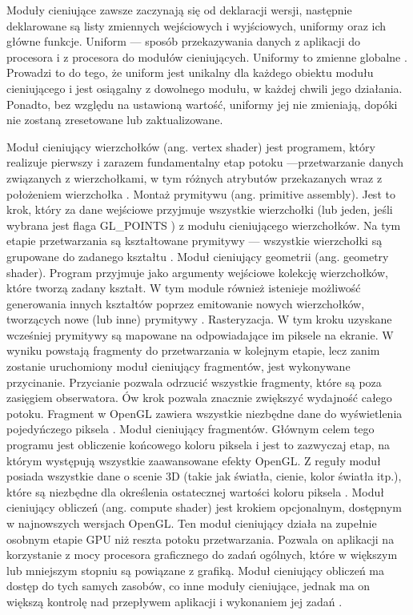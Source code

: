 Moduły cieniujące zawsze zaczynają się od deklaracji wersji, następnie deklarowane są listy zmiennych wejściowych i wyjściowych, uniformy oraz ich główne funkcje. Uniform --- sposób przekazywania danych z aplikacji do procesora i z procesora do modułów cieniujących. Uniformy to zmienne globalne \cite{slownik}. Prowadzi to do tego, że uniform jest unikalny dla każdego obiektu modułu cieniującego i jest osiągalny z dowolnego modułu, w każdej chwili jego działania. Ponadto, bez względu na ustawioną wartość, uniformy jej nie zmieniają, dopóki nie zostaną zresetowane lub zaktualizowane.
\begin{itemize} 
\itemi Moduł cieniujący wierzchołków (ang. vertex shader) jest programem, który realizuje pierwszy i zarazem fundamentalny etap potoku ---przetwarzanie danych związanych z wierzchołkami, w tym różnych atrybutów przekazanych wraz z położeniem wierzchołka \cite{slownik}.
\itemi Montaż prymitywu (ang. primitive assembly). Jest to krok, który za dane wejściowe przyjmuje wszystkie wierzchołki (lub jeden, jeśli wybrana jest flaga GL\_POINTS ) z modułu cieniującego wierzchołków. Na tym etapie przetwarzania są kształtowane prymitywy --- wszystkie wierzchołki są grupowane do zadanego kształtu \cite{opengltutorial}.
\itemi Moduł cieniujący geometrii (ang. geometry shader). Program przyjmuje jako argumenty wejściowe kolekcję wierzchołków, które tworzą zadany kształt. W tym module również istenieje możliwość generowania innych kształtów poprzez emitowanie nowych wierzchołków, tworzących nowe (lub inne) prymitywy \cite{slownik}. 
\itemi Rasteryzacja. W tym kroku uzyskane wcześniej prymitywy są mapowane na odpowiadające im piksele na ekranie. W wyniku powstają fragmenty do przetwarzania w kolejnym etapie, lecz zanim zostanie uruchomiony moduł cieniujący fragmentów, jest wykonywane przycinanie. Przycianie pozwala odrzucić wszystkie fragmenty, które są poza zasięgiem obserwatora. Ów krok pozwala znacznie zwiększyć wydajność całego potoku. Fragment w OpenGL zawiera wszystkie niezbędne dane do wyświetlenia pojedyńczego piksela \cite{slownik}.
\itemi Moduł cieniujący fragmentów. Głównym celem tego programu jest obliczenie końcowego koloru piksela i jest to zazwyczaj etap, na którym występują wszystkie zaawansowane efekty OpenGL. Z reguły moduł posiada wszystkie dane o scenie 3D (takie jak światła, cienie, kolor światła itp.), które są niezbędne dla określenia ostatecznej wartości koloru piksela \cite{slownik}.
\itemi Moduł cieniujący obliczeń (ang. compute shader) jest krokiem opcjonalnym, dostępnym w najnowszych wersjach OpenGL. Ten moduł cieniujący działa na zupełnie osobnym etapie GPU niż reszta potoku przetwarzania. Pozwala on aplikacji na korzystanie z mocy procesora graficznego do zadań ogólnych, które w większym lub mniejszym stopniu są powiązane z grafiką. Moduł cieniujący obliczeń ma dostęp do tych samych zasobów, co inne moduły cieniujące, jednak ma on większą kontrolę nad przepływem aplikacji i wykonaniem jej zadań \cite{OGlOfficialGuide}.
\end{itemize}

